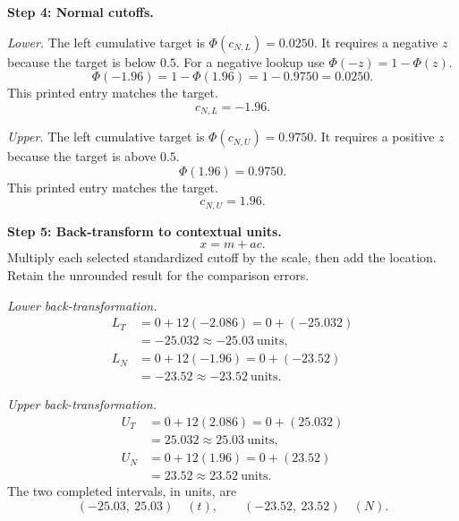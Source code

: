 \begin{enumerate}[leftmargin=*,label=\textbf{\arabic*.},itemsep=12pt,parsep=3pt,topsep=5pt]
\begin{minipage}{\linewidth}
\end{minipage}\par
\par\textbf{Step 4: Normal cutoffs.}\nopagebreak\enspace \par\noindent\begin{minipage}{\linewidth}
\par\textit{Lower.} The left cumulative target is $\Phi(c_{N,L})=0.0250$. It requires a negative $z$ because the target is below $0.5$. For a negative lookup use $\Phi(-z)=1-\Phi(z)$.\[
\Phi(-1.96)=1-\Phi(1.96)=1-0.9750=0.0250.
\]
This printed entry matches the target.\[
c_{N,L}=-1.96.
\]
\end{minipage}\par
\par\noindent\begin{minipage}{\linewidth}
\par\textit{Upper.} The left cumulative target is $\Phi(c_{N,U})=0.9750$. It requires a positive $z$ because the target is above $0.5$.\[
\Phi(1.96)=0.9750.
\]
This printed entry matches the target.\[
c_{N,U}=1.96.
\]
\end{minipage}\par

\par\noindent\begin{minipage}{\linewidth}
\par\textbf{Step 5: Back-transform to contextual units.}\nopagebreak\enspace \[
x=m+ac.
\]
Multiply each selected standardized cutoff by the scale, then add the location. Retain the unrounded result for the comparison errors.
\par\textit{Lower back-transformation.}
\[
\begin{aligned}L_T&=0+12(-2.086)=0+(-25.032)\\&=-25.032\approx\boxed{-25.03\ \text{units}},\\L_N&=0+12(-1.96)=0+(-23.52)\\&=-23.52\approx\boxed{-23.52\ \text{units}}.\end{aligned}
\]
\par\textit{Upper back-transformation.}
\[
\begin{aligned}U_T&=0+12(2.086)=0+(25.032)\\&=25.032\approx\boxed{25.03\ \text{units}},\\U_N&=0+12(1.96)=0+(23.52)\\&=23.52\approx\boxed{23.52\ \text{units}}.\end{aligned}
\]
The two completed intervals, in units, are
\[
\boxed{(-25.03,\ 25.03)\quad(t)},\qquad\boxed{(-23.52,\ 23.52)\quad(N)}.
\]


\end{minipage}
\end{enumerate}
